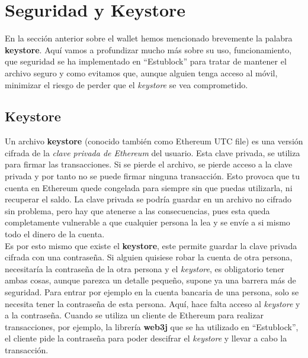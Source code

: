 \section{Seguridad y Keystore}

En la sección anterior sobre el wallet hemos mencionado brevemente la palabra \textbf{keystore}. Aquí vamos a profundizar mucho más sobre su uso, funcionamiento, que seguridad se ha implementado en ``Estublock'' para tratar de mantener el archivo seguro y como evitamos que, aunque alguien tenga acceso al móvil, minimizar el riesgo de perder que el \emph{keystore} se vea comprometido. \\

\subsection{Keystore}

Un archivo \textbf{keystore}\cite{ether_keystore} (conocido también como Ethereum UTC file) es una versión cifrada de la \emph{clave privada de Ethereum}\cite{ether_keystore} del usuario. Esta clave privada, se utiliza para firmar las transacciones. Si se pierde el archivo, se pierde acceso a la clave privada y por tanto no se puede firmar ninguna transacción. Esto provoca que tu cuenta en Ethereum quede congelada para siempre sin que puedas utilizarla, ni recuperar el saldo. La clave privada se podría guardar en un archivo no cifrado sin problema, pero hay que atenerse a las consecuencias, pues esta queda completamente vulnerable a que cualquier persona la lea y se envíe a si mismo todo el dinero de la cuenta. \\

Es por esto mismo que existe el \textbf{keystore}, este permite guardar la clave privada cifrada con una contraseña. Si alguien quisiese robar la cuenta de otra persona, necesitaría la contraseña de la otra persona y el \emph{keystore}, es obligatorio tener ambas cosas, aunque parezca un detalle pequeño, supone ya una barrera más de seguridad. Para entrar por ejemplo en la cuenta bancaria de una persona, solo se necesita tener la contraseña de esta persona. Aquí, hace falta acceso al \emph{keystore} y a la contraseña. Cuando se utiliza un cliente de Ethereum para realizar transacciones, por ejemplo, la librería \textbf{web3j} que se ha utilizado en ``Estublock'', el cliente pide la contraseña para poder descifrar el \emph{keystore} y llevar a cabo la transacción. \\

